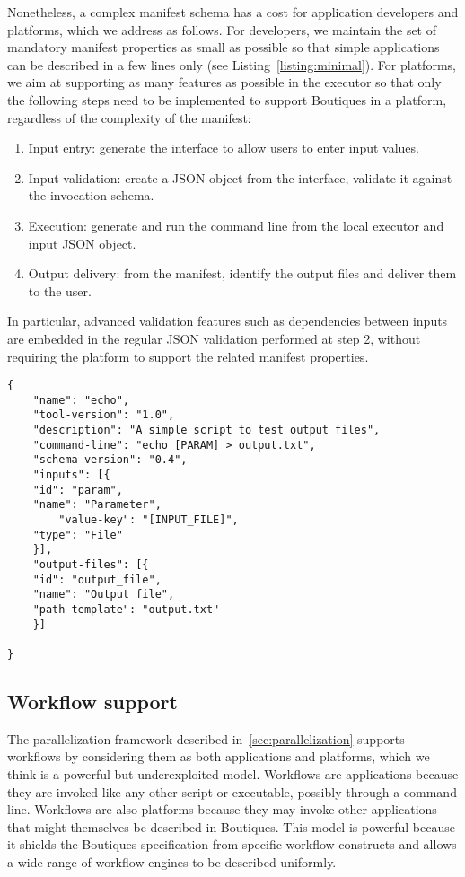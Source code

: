 \documentclass{article}
\newcommand{\boutiques}{Boutiques\xspace}
\begin{document}
Nonetheless, a complex manifest schema has a cost for application
developers and platforms, which we address as follows. For developers,
we maintain the set of mandatory manifest properties as small as
possible so that simple applications can be described in a few lines
only (see Listing~\ref{listing:minimal}). For platforms, we aim at
supporting as many features as possible in the executor so that
only the following steps need to be implemented to support \boutiques
in a platform, regardless of the complexity of the manifest:
\begin{enumerate}
  \item Input entry: generate the interface to allow users to enter
    input values.
  \item Input validation: create a JSON object from the interface,
    validate it against the invocation schema.
  \item Execution: generate and run the command line from the local
    executor and input JSON object.
  \item Output delivery: from the manifest, identify the output files
    and deliver them to the user.
\end{enumerate}
In particular, advanced validation features such as dependencies
between inputs are embedded in the regular JSON validation performed
at step 2, without requiring the platform to support the related
manifest properties.
\begin{listing}
\begin{verbatim}
{
    "name": "echo",
    "tool-version": "1.0",
    "description": "A simple script to test output files",
    "command-line": "echo [PARAM] > output.txt",
    "schema-version": "0.4",
    "inputs": [{
	"id": "param",
	"name": "Parameter",
        "value-key": "[INPUT_FILE]",
	"type": "File"
    }],
    "output-files": [{
	"id": "output_file",
	"name": "Output file",
	"path-template": "output.txt"
    }]

}
\end{verbatim}
\caption{A minimal \boutiques manifest.} 
\label{listing:minimal}
\end{listing}

\subsection{Workflow support}

The parallelization framework described in~\ref{sec:parallelization}
supports workflows by considering them as both applications and
platforms, which we think is a powerful but underexploited
model. Workflows are applications because they are invoked like any
other script or executable, possibly through a command line. Workflows
are also platforms because they may invoke other applications that
might themselves be described in \boutiques. This model is powerful
because it shields the \boutiques specification from specific workflow
constructs and allows a wide range of workflow engines to be described
uniformly. 
\end{document}
